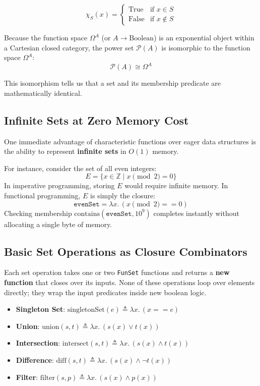 \[
\chi_S(x) = \begin{cases} 
\text{True} & \text{if } x \in S \\ 
\text{False} & \text{if } x \notin S 
\end{cases}
\]

Because the function space $\Omega^A$ (or $A \to \text{Boolean}$) is an exponential object within a Cartesian closed category, the power set $\mathcal{P}(A)$ is isomorphic to the function space $\Omega^A$:
\[ \mathcal{P}(A) \cong \Omega^A \]

This isomorphism tells us that a set and its membership predicate are mathematically identical.

\subsection{Infinite Sets at Zero Memory Cost}

One immediate advantage of characteristic functions over eager data structures is the ability to represent \textbf{infinite sets} in $O(1)$ memory.

For instance, consider the set of all even integers:
\[ E = \{ x \in \mathbb{Z} \mid x \pmod 2 = 0 \} \]
In imperative programming, storing $E$ would require infinite memory. In functional programming, $E$ is simply the closure:
\[ \texttt{evenSet} = \lambda x.\, (x \pmod 2 == 0) \]
Checking membership $\text{contains}(\texttt{evenSet}, 10^9)$ completes instantly without allocating a single byte of memory.

\subsection{Basic Set Operations as Closure Combinators}

Each set operation takes one or two \texttt{FunSet} functions and returns a \textbf{new function} that closes over its inputs. None of these operations loop over elements directly; they wrap the input predicates inside new boolean logic.

\begin{itemize}
    \item \textbf{Singleton Set}: $\text{singletonSet}(e) \triangleq \lambda x.\, (x == e)$
    \item \textbf{Union}: $\text{union}(s, t) \triangleq \lambda x.\, (s(x) \lor t(x))$
    \item \textbf{Intersection}: $\text{intersect}(s, t) \triangleq \lambda x.\, (s(x) \land t(x))$
    \item \textbf{Difference}: $\text{diff}(s, t) \triangleq \lambda x.\, (s(x) \land \neg t(x))$
    \item \textbf{Filter}: $\text{filter}(s, p) \triangleq \lambda x.\, (s(x) \land p(x))$
\end{itemize}


